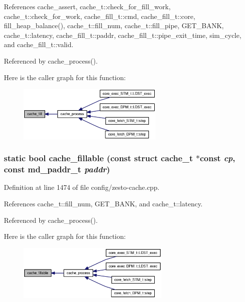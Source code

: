 References cache\_\-assert, cache\_\-t::check\_\-for\_\-fill\_\-work, cache\_\-t::check\_\-for\_\-work, cache\_\-fill\_\-t::cmd, cache\_\-fill\_\-t::core, fill\_\-heap\_\-balance(), cache\_\-t::fill\_\-num, cache\_\-t::fill\_\-pipe, GET\_\-BANK, cache\_\-t::latency, cache\_\-fill\_\-t::paddr, cache\_\-fill\_\-t::pipe\_\-exit\_\-time, sim\_\-cycle, and cache\_\-fill\_\-t::valid.

Referenced by cache\_\-process().

Here is the caller graph for this function:\nopagebreak
\begin{figure}[H]
\begin{center}
\leavevmode
\includegraphics[width=205pt]{config_2zesto-cache_8cpp_4268c8076eb193fe97abe55263b81c9c_icgraph}
\end{center}
\end{figure}
\subsubsection[{cache\_\-fillable}]{\setlength{\rightskip}{0pt plus 5cm}static bool cache\_\-fillable (const struct {\bf cache\_\-t} $\ast$const  {\em cp}, \/  const {\bf md\_\-paddr\_\-t} {\em paddr})\hspace{0.3cm}{\tt  [inline, static]}}\label{config_2zesto-cache_8cpp_b1883760de25022c2b30d602d5b50c4a}




Definition at line 1474 of file config/zesto-cache.cpp.

References cache\_\-t::fill\_\-num, GET\_\-BANK, and cache\_\-t::latency.

Referenced by cache\_\-process().

Here is the caller graph for this function:\nopagebreak
\begin{figure}[H]
\begin{center}
\leavevmode
\includegraphics[width=214pt]{config_2zesto-cache_8cpp_b1883760de25022c2b30d602d5b50c4a_icgraph}
\end{center}
\end{figure}
